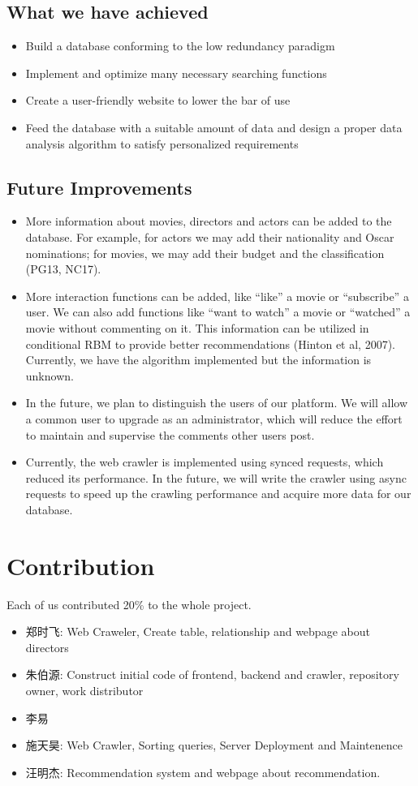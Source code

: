 \begin{CJK*}{UTF8}{gbsn}
\subsection{What we have achieved}
\begin{itemize}
\item Build a database conforming to the low redundancy paradigm
\item Implement and optimize many necessary  searching functions
\item Create a user-friendly website to lower the bar of use
\item Feed the database with a suitable amount of data and design a proper data analysis algorithm to satisfy personalized requirements
\end{itemize}
\subsection{Future Improvements}
\begin{itemize}
\item More information about movies, directors and actors can be added to the database. For example, for actors we may add their nationality and Oscar nominations; for movies, we may add their budget and the classification (PG13, NC17).
\item More interaction functions can be added, like ``like'' a movie or ``subscribe'' a user. We can also add functions like ``want to watch'' a movie or ``watched'' a movie without commenting on it. This information can be utilized in conditional RBM to provide better recommendations (Hinton et al, 2007). Currently, we have the algorithm implemented but the information is unknown. 
\item In the future, we plan to distinguish the users of our platform. We will allow a common user to upgrade as an administrator, which will reduce the effort to maintain and supervise the comments other users post.
\item Currently, the web crawler is implemented using synced requests, which reduced its performance. In the future, we will write the crawler using async requests to speed up the crawling performance and acquire more data for our database.
\end{itemize}

\section{Contribution}
Each of us contributed 20\% to the whole project.
\begin{itemize}
    \item 郑时飞:    Web Craweler, Create table, relationship and webpage about directors
    \item 朱伯源: Construct initial code of frontend, backend and crawler, repository owner, work distributor
    \item 李易
    \item 施天昊:    Web Crawler, Sorting queries, Server Deployment and Maintenence
    \item 汪明杰: Recommendation system and webpage about recommendation.
\end{itemize}

\end{CJK*}
